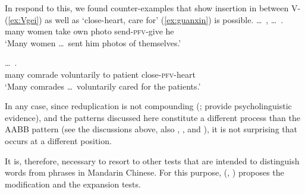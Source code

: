 \z\z

In respond to this, we found counter-examples that show  insertion in between V- (\ref{ex:Vgei}) as well as  `close-heart, care for' (\ref{ex:guanxin}) is possible.
\ea\label{ex:Vgei}%
\gll \ldots\,  ,    \ldots\,  .\\
{} many women take own photo {} send-\textsc{pfv}-give he\\
\glt `Many women \ldots\, sent him photos of themselves.'
\z

\ea\label{ex:guanxin}%
\gll {}  \ldots\,    .\\
many comrade {} voluntarily to patient close-\textsc{pfv}-heart\\
\glt `Many comrades \ldots\, voluntarily cared for the patients.'
\z

In any case, since reduplication is not compounding (\citealt[149--150]{Sui2018}; \citealt{GaoEtAl2021} provide psycholinguistic evidence),
and the patterns discussed here constitute a different process than the AABB pattern
(see the discussions above, also \citealt[Sec.\,4.3]{Deng2013}, \citealt[Sec.\,2]{SuiHu2016}, \citealt{Sui2018} and \citealt{Wang2023}),
it is not surprising that  occurs at a different position.

It is, therefore, necessary to resort to other tests that are intended to distinguish words from phrases in Mandarin Chinese. 
 For this purpose, \citeauthor{Dai1992} (\citeyear[32--33]{Dai1992}, \citeyear[117--120]{Dai1998}) proposes the modification and the expansion tests.

